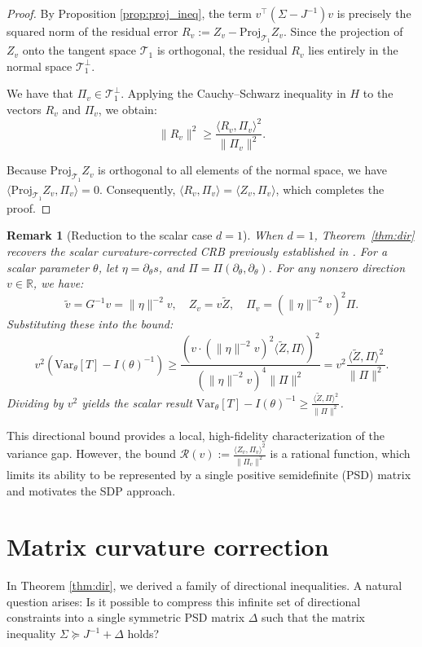 \documentclass[pdflatex,sn-mathphys-num]{sn-jnl}%
\newcommand{\Var}{\mathrm{Var}}
\newcommand{\ip}[2]{\langle #1,#2\rangle}
\theoremstyle{thmstyleone}%
\theoremstyle{thmstyletwo}%
\newtheorem{remark}{Remark}%
\theoremstyle{thmstylethree}%
\begin{document}
\begin{proof}
By Proposition \ref{prop:proj_ineq}, the term $v^\top(\Sigma-J^{-1})v$ is precisely the squared norm of the residual error $R_v := Z_v - \mathrm{Proj}_{\mathcal{T}_1} Z_v$. Since the projection of $Z_v$ onto the tangent space $\mathcal{T}_1$ is orthogonal, the residual $R_v$ lies entirely in the normal space $\mathcal{T}_1^\perp$.

We have that $\Pi_v \in \mathcal{T}_1^\perp$. Applying the Cauchy--Schwarz inequality in $H$ to the vectors $R_v$ and $\Pi_v$, we obtain:
\[
\|R_v\|^2 \ge \frac{\ip{R_v}{\Pi_v}^2}{\|\Pi_v\|^2}.
\]

Because $\mathrm{Proj}_{\mathcal{T}_1} Z_v$ is orthogonal to all elements of the normal space, we have $\ip{\mathrm{Proj}_{\mathcal{T}_1} Z_v}{\Pi_v} = 0$. Consequently, $\ip{R_v}{\Pi_v} = \ip{Z_v}{\Pi_v}$, which completes the proof.
\end{proof}

\begin{remark}[Reduction to the scalar case \(d=1\)]
When \(d=1\), Theorem~\ref{thm:dir} recovers the scalar curvature-corrected CRB previously established in \cite{srk}. For a scalar parameter \(\theta\), let \(\eta = \partial_\theta s\), and \(\Pi = \Pi(\partial_\theta, \partial_\theta)\). For any nonzero direction \(v \in \mathbb{R}\), we have:
\[
\widetilde v = G^{-1} v = \|\eta\|^{-2} v, \quad Z_v = v \widetilde Z, \quad \Pi_v = (\|\eta\|^{-2} v)^2 \Pi.
\]
Substituting these into the bound:
\[
v^2 (\Var_\theta[T] - I(\theta)^{-1}) \ge \frac{(v \cdot (\|\eta\|^{-2} v)^2 \ip{\widetilde Z}{\Pi})^2}{(\|\eta\|^{-2} v)^4 \|\Pi\|^2} = v^2 \frac{\ip{\widetilde Z}{\Pi}^2}{\|\Pi\|^2}.
\]
Dividing by \(v^2\) yields the scalar result \(\Var_\theta[T] - I(\theta)^{-1} \ge \frac{\ip{\widetilde Z}{\Pi}^2}{\|\Pi\|^2}\).
\end{remark}

This directional bound provides a local, high-fidelity characterization of the variance gap. However, the bound $\mathcal{R}(v):=\frac{\ip{Z_v}{\Pi_v}^{2}}{\|\Pi_v\|^{2}}$ is a rational function, which limits its ability to be represented by a single positive semidefinite (PSD) matrix and motivates the SDP approach.

\section{Matrix curvature correction}
\label{sec:mc}
In Theorem \ref{thm:dir}, we derived a family of directional inequalities. A natural question arises: Is it possible to compress this infinite set of directional constraints into a single symmetric PSD matrix $\Delta$ such that the matrix inequality $\Sigma \succeq J^{-1} + \Delta$ holds?
\end{document}
